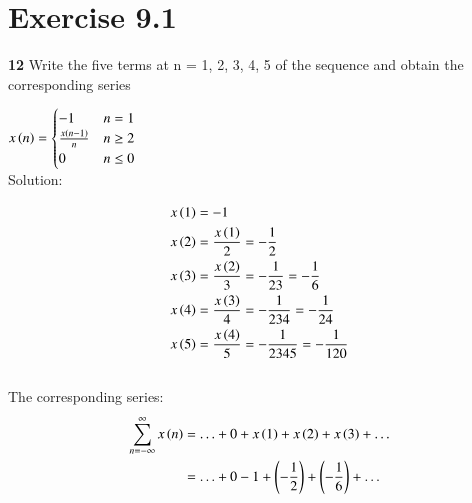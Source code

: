 \documentclass[journal,12pt,twocolumn]{IEEEtran}
\begin{document}


\vspace{3cm}

\title{}
\author{EE23BTECH11217 - Prajwal M$^{*}$
}
\maketitle
\newpage
\bigskip

\renewcommand{\thefigure}{\theenumi}
\renewcommand{\thetable}{\theenumi}


\section*{Exercise 9.1}

\noindent \textbf{12} \hspace{2pt}Write the five terms at n = 1, 2, 3, 4, 5 of the sequence and obtain the corresponding series

$ x \left(n\right) =
\begin{cases}
-1 & n = 1 \\
\frac{x \left(n-1\right)}{n} & n \geq 2 \\
 0 & n \leq 0
\end{cases}
$
\\

\noindent Solution:

\noindent
\begin{align*}
x \left(1\right) & = -1 \\
x \left(2\right) & = \frac{x \left(1\right)}{2} = -\frac{1}{2} \\
x \left(3\right) & = \frac{x \left(2\right)}{3} = -\frac{1}{2   3} = -\frac{1}{6}\\
x \left(4\right) & = \frac{x \left(3\right)}{4} = -\frac{1}{2   3   4} = -\frac{1}{24}\\
x \left(5\right) & = \frac{x \left(4\right)}{5} = -\frac{1}{2   3   4   5} = -\frac{1}{120}
\end{align*} \\


The corresponding series:
\begin{align*}
    \sum_{n=-\infty}^{\infty} x \left(n\right) & = \ldots + 0 + x \left(1\right) + x \left(2\right) + x \left(3\right) + \ldots \\
    & = \ldots + 0 -1 +   \left(-\frac{1}{2} \right) +   \left(-\frac{1}{6} \right) + \ldots \\
\end{align*}
\end{document}
